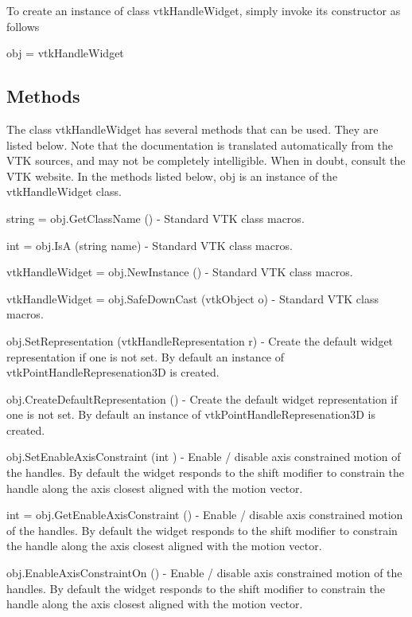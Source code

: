 To create an instance of class vtk\-Handle\-Widget, simply invoke its constructor as follows \begin{DoxyVerb}  obj = vtkHandleWidget
\end{DoxyVerb}
 \hypertarget{vtkwidgets_vtkxyplotwidget_Methods}{}\subsection{Methods}\label{vtkwidgets_vtkxyplotwidget_Methods}
The class vtk\-Handle\-Widget has several methods that can be used. They are listed below. Note that the documentation is translated automatically from the V\-T\-K sources, and may not be completely intelligible. When in doubt, consult the V\-T\-K website. In the methods listed below, {\ttfamily obj} is an instance of the vtk\-Handle\-Widget class. 
\begin{DoxyItemize}
\item {\ttfamily string = obj.\-Get\-Class\-Name ()} -\/ Standard V\-T\-K class macros.  
\item {\ttfamily int = obj.\-Is\-A (string name)} -\/ Standard V\-T\-K class macros.  
\item {\ttfamily vtk\-Handle\-Widget = obj.\-New\-Instance ()} -\/ Standard V\-T\-K class macros.  
\item {\ttfamily vtk\-Handle\-Widget = obj.\-Safe\-Down\-Cast (vtk\-Object o)} -\/ Standard V\-T\-K class macros.  
\item {\ttfamily obj.\-Set\-Representation (vtk\-Handle\-Representation r)} -\/ Create the default widget representation if one is not set. By default an instance of vtk\-Point\-Handle\-Represenation3\-D is created.  
\item {\ttfamily obj.\-Create\-Default\-Representation ()} -\/ Create the default widget representation if one is not set. By default an instance of vtk\-Point\-Handle\-Represenation3\-D is created.  
\item {\ttfamily obj.\-Set\-Enable\-Axis\-Constraint (int )} -\/ Enable / disable axis constrained motion of the handles. By default the widget responds to the shift modifier to constrain the handle along the axis closest aligned with the motion vector.  
\item {\ttfamily int = obj.\-Get\-Enable\-Axis\-Constraint ()} -\/ Enable / disable axis constrained motion of the handles. By default the widget responds to the shift modifier to constrain the handle along the axis closest aligned with the motion vector.  
\item {\ttfamily obj.\-Enable\-Axis\-Constraint\-On ()} -\/ Enable / disable axis constrained motion of the handles. By default the widget responds to the shift modifier to constrain the handle along the axis closest aligned with the motion vector.  

\end{DoxyItemize}
